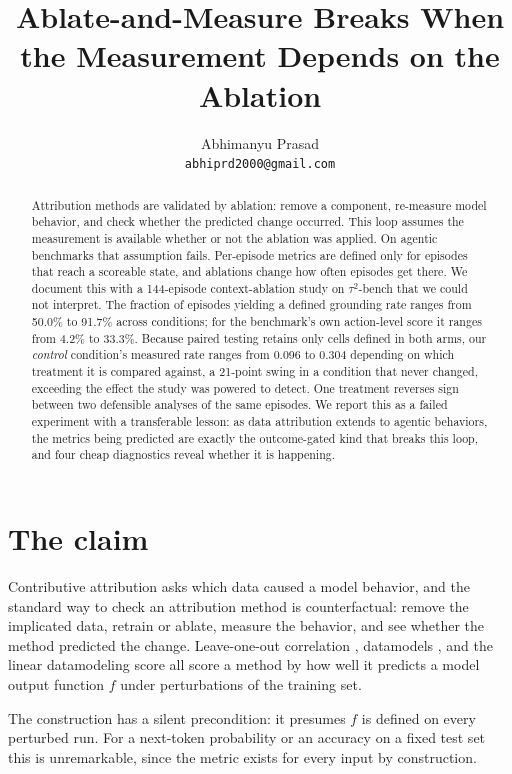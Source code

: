 \documentclass{article}
\title{Ablate-and-Measure Breaks When the Measurement Depends on the Ablation}
\author{%
  Abhimanyu Prasad \\
  \texttt{abhiprd2000@gmail.com}
}
\begin{document}
\maketitle

\begin{abstract}
Attribution methods are validated by ablation: remove a component, re-measure model
behavior, and check whether the predicted change occurred. This loop assumes the
measurement is available whether or not the ablation was applied. On agentic
benchmarks that assumption fails. Per-episode metrics are defined only for episodes
that reach a scoreable state, and ablations change how often episodes get there. We
document this with a 144-episode context-ablation study on $\tau^2$-bench that we could
not interpret. The fraction of episodes yielding a defined grounding rate ranges from
50.0\% to 91.7\% across conditions; for the benchmark's own action-level score it
ranges from 4.2\% to 33.3\%. Because paired testing retains only cells defined in both
arms, our \emph{control} condition's measured rate ranges from 0.096 to 0.304 depending
on which treatment it is compared against, a 21-point swing in a condition that never
changed, exceeding the effect the study was powered to detect. One treatment reverses
sign between two defensible analyses of the same episodes. We report this as a failed
experiment with a transferable lesson: as data attribution extends to agentic
behaviors, the metrics being predicted are exactly the outcome-gated kind that breaks
this loop, and four cheap diagnostics reveal whether it is happening.
\end{abstract}

\section{The claim}

Contributive attribution asks which data caused a model behavior, and the standard way
to check an attribution method is counterfactual: remove the implicated data, retrain
or ablate, measure the behavior, and see whether the method predicted the change.
Leave-one-out correlation \citep{koh2017influence}, datamodels
\citep{ilyas2022datamodels}, and the linear datamodeling score \citep{park2023trak} all
score a method by how well it predicts a model output function $f$ under perturbations
of the training set.

The construction has a silent precondition: it presumes $f$ is defined on every
perturbed run. For a next-token probability or an accuracy on a fixed test set this is
unremarkable, since the metric exists for every input by construction.
\end{document}
